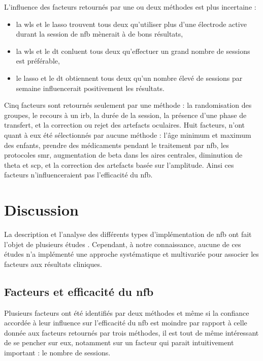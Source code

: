 L'influence des facteurs retournés par une ou deux méthodes est plus incertaine :
\begin{itemize}
	\item la \gls{wls} et le \gls{lasso} trouvent tous deux qu'utiliser plus d'une électrode active durant la session de \gls{nfb} mènerait à de bons résultats,
  \item la \gls{wls} et le \gls{dt} conluent tous deux qu'effectuer un grand nombre de sessions est préférable, 
  \item le \gls{lasso} et le \gls{dt} obtiennent tous deux qu'un nombre élevé de sessions par semaine influencerait positivement les résultats. 
\end{itemize}

Cinq facteurs sont retournés seulement par une méthode : la randomisation des groupes, le recours à un \gls{irb}, la durée de la session, la présence d'une phase de transfert,
et la correction ou rejet des artefacts oculaires. Huit facteurs, n'ont quant à eux été sélectionnés par aucune méthode : l'âge minimum et maximum des enfants, prendre des 
médicaments pendant le traitement par \gls{nfb}, les protocoles \gls{smr}, augmentation de beta dans les aires centrales, diminution de theta et \gls{scp}, et la correction
des artefacts basée sur l'amplitude. Ainsi ces facteurs n'influenceraient pas l'efficacité du \gls{nfb}. 

\section{Discussion}

La description et l'analyse des différents types d'implémentation de \gls{nfb} ont fait l'objet de plusieurs études \citep{Arns2014, 
Jeunet2018, Arns2009, Cortese2016}. Cependant, à notre connaissance, aucune de ces études n'a implémenté 
une approche systématique et multivariée pour associer les facteurs aux résultats cliniques.

\subsection{Facteurs et efficacité du \gls{nfb}}

Plusieurs facteurs ont été identifiés par deux méthodes et même si la confiance accordée à leur influence sur l'efficacité du \gls{nfb} est moindre par rapport
à celle donnée aux facteurs retournés par trois méthodes, il est tout de même intéressant de se pencher sur eux, notamment sur un facteur qui 
parait intuitivement important : le nombre de sessions.

